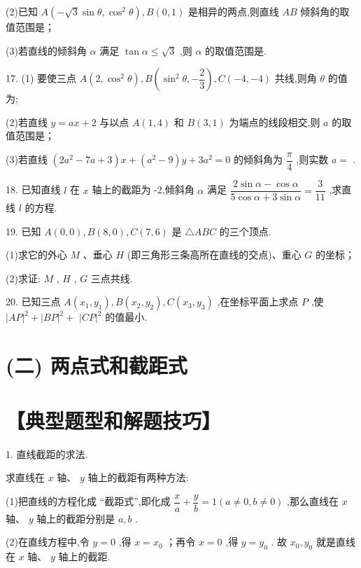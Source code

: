 (2)已知 $A\left( {-\sqrt{3}\sin \theta ,{\cos }^{2}\theta }\right) ,B\left( {0,1}\right)$ 是相异的两点,则直线 ${AB}$ 倾斜角的取值范围是\blkda{}；

(3)若直线的倾斜角 $\alpha$ 满足 $\tan \alpha  \leq  \sqrt{3}$ ,则 $\alpha$ 的取值范围是\blkda{}.

17. (1) 要使三点 $A\left( {2,{\cos }^{2}\theta }\right) ,B\left( {{\sin }^{2}\theta , - \dfrac{2}{3}}\right) ,C\left( {-4, - 4}\right)$ 共线,则角 $\theta$ 的值为\blkda{};

(2)若直线 $y = {ax} + 2$ 与以点 $A\left( {1,4}\right)$ 和 $B\left( {3,1}\right)$ 为端点的线段相交,则 $a$ 的取值范围是\blkda{}；

(3)若直线 $\left( {2{a}^{2} - {7a} + 3}\right) x + \left( {{a}^{2} - 9}\right) y + 3{a}^{2} = 0$ 的倾斜角为 $\dfrac{\pi }{4}$ ,则实数 $a =$ \blkda{}.

18. 已知直线 $l$ 在 $x$ 轴上的截距为 -2,倾斜角 $\alpha$ 满足 $\dfrac{2\sin \alpha  - \cos \alpha }{5\cos \alpha  + 3\sin \alpha } = \dfrac{3}{11}$ ,求直线 $l$ 的方程.

19. 已知 $A\left( {0,0}\right) ,B\left( {8,0}\right) ,C\left( {7,6}\right)$ 是 $\bigtriangleup {ABC}$ 的三个顶点.

(1)求它的外心 $M$ 、垂心 $H$ (即三角形三条高所在直线的交点)、重心 $G$ 的坐标；

(2)求证: $M$ , $H$ , $G$ 三点共线.

20. 已知三点 $A\left( {{x}_{1},{y}_{1}}\right) ,B\left( {{x}_{2},{y}_{2}}\right) ,C\left( {{x}_{3},{y}_{3}}\right)$ ,在坐标平面上求点 $P$ ,使 ${\left| AP\right| }^{2} + {\left| BP\right| }^{2} +$  ${\left| CP\right| }^{2}$ 的值最小.

\section*{(二) 两点式和截距式}

\section*{【典型题型和解题技巧】}

1. 直线截距的求法.

求直线在 $x$ 轴、 $y$ 轴上的截距有两种方法:

(1)把直线的方程化成 “截距式”,即化成 $\dfrac{x}{a} + \dfrac{y}{b} = 1\left( {a \neq  0,b \neq  0}\right)$ ,那么直线在 $x$ 轴、 $y$ 轴上的截距分别是 $a,b$ .

(2)在直线方程中,令 $y = 0$ ,得 $x = {x}_{0}$ ；再令 $x = 0$ ,得 $y = {y}_{0}$ . 故 ${x}_{0},{y}_{0}$ 就是直线在 $x$ 轴、 $y$ 轴上的截距.

